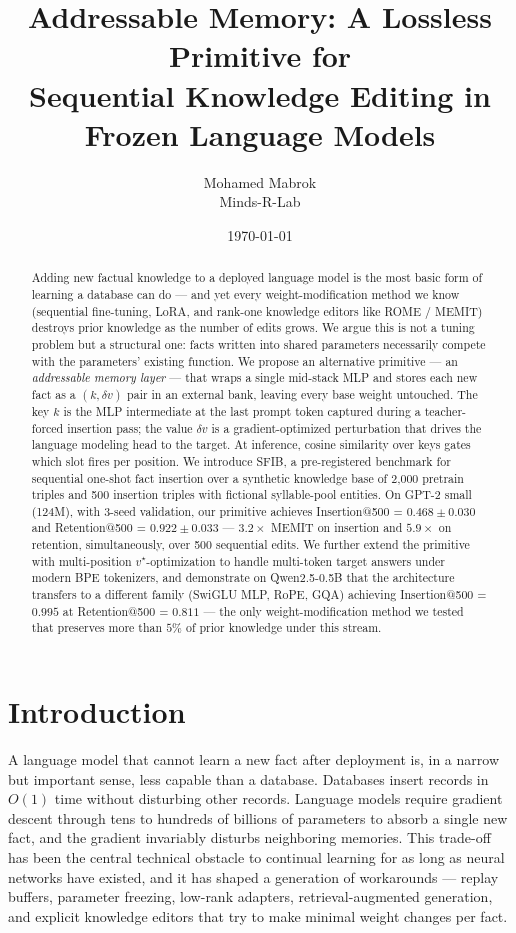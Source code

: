 \documentclass[11pt,a4paper]{article}
\title{\bf Addressable Memory: A Lossless Primitive for \\
Sequential Knowledge Editing in Frozen Language Models}
\author{Mohamed Mabrok \\ Minds-R-Lab}
\date{\today}
\begin{document}
\maketitle

\begin{abstract}
\noindent
Adding new factual knowledge to a deployed language model is the most basic
form of learning a database can do --- and yet every weight-modification
method we know (sequential fine-tuning, LoRA, and rank-one knowledge editors
like ROME / MEMIT) destroys prior knowledge as the number of edits grows.
We argue this is not a tuning problem but a structural one: facts written
into shared parameters necessarily compete with the parameters' existing
function. We propose an alternative primitive --- an \emph{addressable
memory layer} --- that wraps a single mid-stack MLP and stores each new fact
as a $(k, \delta v)$ pair in an external bank, leaving every base weight
untouched. The key $k$ is the MLP intermediate at the last prompt token
captured during a teacher-forced insertion pass; the value $\delta v$ is a
gradient-optimized perturbation that drives the language modeling head to
the target. At inference, cosine similarity over keys gates which slot
fires per position. We introduce SFIB, a pre-registered benchmark for
sequential one-shot fact insertion over a synthetic knowledge base of
2{,}000 pretrain triples and 500 insertion triples with fictional
syllable-pool entities. On GPT-2 small (124M), with 3-seed validation, our
primitive achieves Insertion@500 = $0.468 \pm 0.030$ and Retention@500 =
$0.922 \pm 0.033$ --- $3.2\times$ MEMIT on insertion and $5.9\times$ on
retention, simultaneously, over 500 sequential edits. We further extend
the primitive with multi-position $v^\star$-optimization to handle
multi-token target answers under modern BPE tokenizers, and demonstrate
on Qwen2.5-0.5B that the architecture transfers to a different family
(SwiGLU MLP, RoPE, GQA) achieving Insertion@500 = $0.995$ at
Retention@500 = $0.811$ --- the only weight-modification method we tested
that preserves more than $5\%$ of prior knowledge under this stream.
\end{abstract}

\section{Introduction}

A language model that cannot learn a new fact after deployment is, in a
narrow but important sense, less capable than a database. Databases insert
records in $O(1)$ time without disturbing other records. Language models
require gradient descent through tens to hundreds of billions of parameters
to absorb a single new fact, and the gradient invariably disturbs
neighboring memories. This trade-off has been the central technical
obstacle to continual learning for as long as neural networks have existed,
and it has shaped a generation of workarounds --- replay buffers, parameter
freezing, low-rank adapters, retrieval-augmented generation, and explicit
knowledge editors that try to make minimal weight changes per fact.
\end{document}
